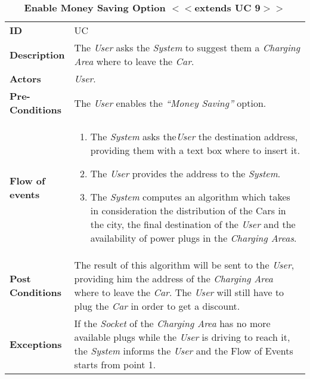 \begin{longtable}{|p{0.2\linewidth} p{0.8\linewidth}|}
	\captionsetup{labelformat=empty} %
	\caption{\textbf{Enable Money Saving Option $<<$extends UC 9$>>$}} %
	\label{UC_PlugCar}%
	\\ \hline %
	
	\textbf{ID} & UC\theUseCaseIdCounter \\ \hline
	\textbf{Description} & The \emph{User} asks the \emph{System} to suggest them a \emph{Charging Area} where to leave the \emph{Car}. \\ \hline
	\textbf{Actors} & \emph{User}.\\ \hline
	\textbf{Pre-Conditions} & The \emph{User} enables the \textit{\textquotedblleft{Money Saving}\textquotedblright} option. \\ \hline
	\textbf{Flow of events} & 
	\begin{enumerate}
		\item The \emph{System} asks the\emph{User} the destination address, providing them with a text box where to insert it.
		\item The \emph{User} provides the address to the \emph{System}.
		\item The \emph{System} computes an algorithm which takes in consideration the distribution of the Cars in the city, the final destination of the \emph{User} and the availability of power plugs in the \emph{Charging Areas}.
	\end{enumerate}	 \\ \hline
	\textbf{Post Conditions} &  The result of this algorithm will be sent to the \emph{User}, providing him the address of the \emph{Charging Area} where to leave the \emph{Car}. The \emph{User} will still have to plug the \emph{Car} in order to get a discount.
	\\ \hline
	\textbf{Exceptions} & If the \emph{Socket} of the \emph{Charging Area} has no more available plugs while the \emph{User} is driving to reach it, the \emph{System} informs the \emph{User} and the Flow of Events starts from point 1.\\ \hline
\end{longtable}
